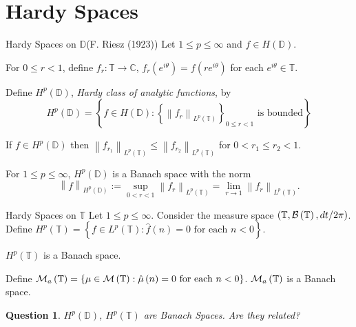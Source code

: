\documentclass{beamer}
\newtheorem{question}[theorem]{Question}
\numberwithin{equation}{subsection}
\newcommand{\C}{\mathbb C}
\newcommand{\D}{\mathbb D}
\newcommand{\T}{\mathbb T}
\newcommand{\calB}{{\cal B}}
\newcommand{\calM}{{\cal M}}
\newcommand{\norm}[1]{\left\lVert #1 \right\rVert}
\begin{document}
 \section{Hardy Spaces}
 \begin{frame}{Hardy Spaces on $\D$}{(F. Riesz (1923))}
     \pause
     Let $1\le p \le \infty$ and $f\in H \left( \D \right)$.

For $0\le r < 1$, define $f_{r} : \T \to \C$, $f_{r} \left( e^{i\theta} \right) = f\left( re^{i\theta} \right)$ for each $e^{i\theta} \in \T$.
     \pause

     Define $H^{p} \left( \D \right)$, \textit{Hardy class of analytic functions}, by 
     \begin{equation*}
	 H^{p} \left( \D \right) = \left\{ f\in H\left( \D \right) : \left\{ \norm{f_{r}}_{L^{p} \left( \T \right)} \right\}_{0\le r < 1} \text{ is bounded} \right\} 
     \end{equation*}
\pause
\begin{theorem}
	 If $f\in H^{p} \left( \D \right)$ then
	 $\norm{f_{r_{1}}}_{L^{p} \left( \T \right)} \le \norm{f_{r_{2}}}_{L^{p} \left( \T \right)}$
	 for $0 < r_{1} \le r_{2} < 1$.
	 \label{thm:increasing-norm}
     \end{theorem}
\pause
     \begin{theorem}
	 For $1\le p \le \infty$, $H^{p} \left( \D \right)$ is a Banach space with the norm
	 \begin{equation*}
	     \norm{f}_{H^{p} \left( \D \right)}:=\sup_{0< r < 1} \norm{f_r}_{L^{p} \left( \T \right)} = \lim_{r \to 1} \norm{f_{r}}_{L^{p} \left( \T \right)}.
	 \end{equation*}
	 \label{thm:HpD-Banach}
     \end{theorem}
 \end{frame}

 \begin{frame}{Hardy Spaces on $\T$}
     \pause
     Let $1 \le p \le \infty$. Consider the measure space $\left( \T, \calB\left( \T \right), dt/2\pi \right)$. 
     Define
     $H^{p} \left( \T \right) = \left\{ f\in L^{p} \left( \T \right) : \hat{f}\left( n \right) = 0 \text{ for each } n<0 \right\}$.
     
     $H^{p}\left( \T \right)$ is a Banach space.

     \pause

     Define $\calM_{a} \left( \T \right) = \left\{ \mu \in \calM \left( \T \right) : \hat{\mu} \left( n \right) = 0 \text{ for each } n < 0 \right\}$.
     $\calM_{a} \left( \T \right)$ is a Banach space.

     \pause
     \begin{question}
	 $H^{p} \left( \D \right)$, $H^{p} \left( \T \right)$ are Banach Spaces. Are they related? 
     \end{question}
     \pause
      \end{frame}
\end{document}
